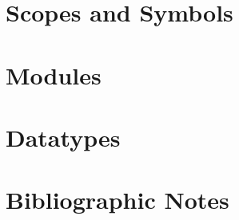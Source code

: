 \label{imperative:compiling}
\section{Scopes and Symbols}

\section{Modules}

\section{Datatypes}

\section{Bibliographic Notes}\label{imperative:compiling:notes}